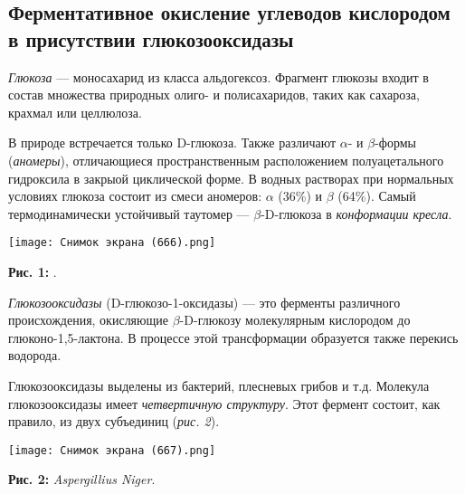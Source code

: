 \documentclass[a4paper]{article}
\begin{document}
\subsection{\Large Ферментативное окисление углеводов кислородом в присутствии глюкозооксидазы}
\par \hspace{0.33 cm}
\textit{Глюкоза} --- моносахарид из класса альдогексоз. Фрагмент глюкозы входит в состав множества природных олиго- и полисахаридов, таких как сахароза, крахмал или целлюлоза. \par \vspace{0.2 cm}
В природе встречается только D-глюкоза. Также различают $\alpha$- и $\beta$-формы (\textit{аномеры}), отличающиеся пространственным расположением полуацетального гидроксила в закрыой циклической форме. В водных растворах при нормальных условиях глюкоза состоит из смеси аномеров: $\alpha$ (36\%) и $\beta$ (64\%). Самый термодинамически устойчивый таутомер --- $\beta$-D-глюкоза в \textit{конформации кресла}.

\graphicspath{{./images/}}
		\begin{center}
		
			\texttt{[image: Снимок экрана (666).png]}
    \par
\textbf{Рис. 1: }.
 \end{center}
\par \vspace{0.5 cm}

\textit{Глюкозооксидазы} (D-глюкозо-1-оксидазы) --- это ферменты различного происхождения, окисляющие $\beta$-D-глюкозу молекулярным кислородом до глюконо-1,5-лактона. В процессе этой трансформации образуется также перекись водорода. \par \vspace{0.2 cm}
Глюкозооксидазы выделены из бактерий, плесневых грибов и т.д. Молекула глюкозооксидазы имеет \textit{четвертичную структуру}. Этот фермент состоит, как правило, из двух субъединиц (\textit{рис. 2}).

\graphicspath{{./images/}}
		\begin{center}
		
			\texttt{[image: Снимок экрана (667).png]}
    \par
\textbf{Рис. 2: } \textit{Aspergillius Niger}.
 \end{center}
\par \vspace{0.5 cm}
\end{document}
